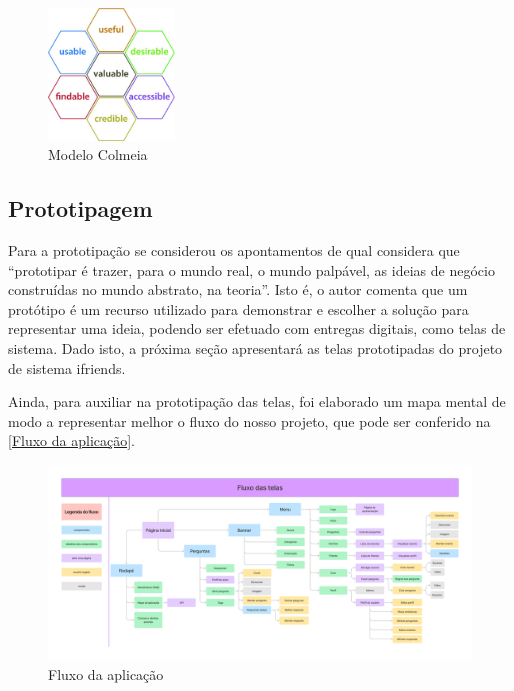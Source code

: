\begin{figure}[htb]
\centering
\caption{\label{modelo colmeia} Modelo Colmeia}
\includegraphics[width=0.3\textwidth]{anexos/Imagens_Proposta/modelo_colmeia.jpg}
\end{figure}
\FloatBarrier

\subsection{Prototipagem}
Para a prototipação se considerou os apontamentos de  qual considera que ``prototipar é trazer, para o mundo real, o mundo palpável, as ideias de negócio construídas no mundo abstrato, na teoria''. Isto é, o autor comenta que um protótipo é um recurso utilizado para demonstrar e escolher a solução para representar uma ideia, podendo ser efetuado com entregas digitais, como telas de sistema. Dado isto, a próxima seção apresentará as telas prototipadas do projeto de sistema \gls{ifriends}.

Ainda, para auxiliar na prototipação das telas, foi elaborado um mapa mental de modo a representar melhor o fluxo do nosso projeto, que pode ser conferido na \autoref{Fluxo da aplicação}.

\begin{figure}[htb]
\centering
\caption{\label{Fluxo da aplicação} Fluxo da aplicação}
\includegraphics[width=1\textwidth]{anexos/Imagens_Prototipo/fluxo_telas.png}
\end{figure}
\FloatBarrier

